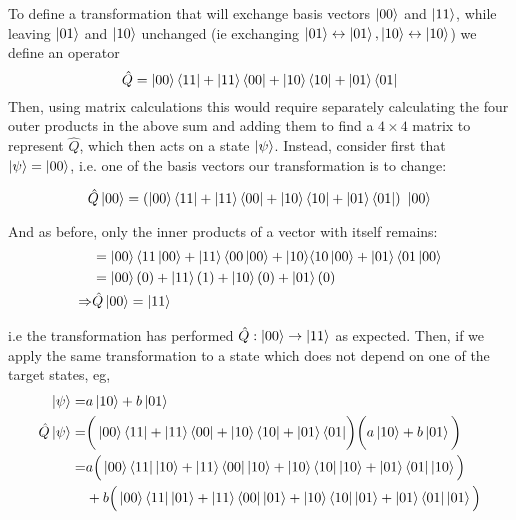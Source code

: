 \begin{example}
    To define a transformation that will exchange basis vectors $\ket{00}$ and $\ket{11}$, 
        while leaving $\ket{01}$ and $\ket{10}$ unchanged (ie exchanging $\ket{01} \leftrightarrow \ket{01}, \ket{10} \leftrightarrow \ket{10} $) 
        we define an operator
    \begin{equation}
        \hat{Q} = \ket{00} \bra{11} + \ket{11} \bra{00} + |10 \rangle \bra{10} + \ket{01} \langle 01| 
    \end{equation}
    Then, using matrix calculations this would require separately calculating the four outer products in the above sum and adding them to find a $4\times4$ matrix to represent $\hat{Q}$, 
        which then acts on a state $\ket{\psi}$. 
    Instead, consider first that $\ket{\psi} = \ket{00}$, i.e. one of the basis vectors our transformation is to change:

    \begin{equation}
        \hat{Q}\ket{00} = \left(\ket{00} \bra{11} + \ket{11} \bra{00} + |10 \rangle \bra{10} + \ket{01} \langle 01|\right) \ \ket{00} 
    \end{equation}

    And as before, only the inner products of a vector with itself remains:
    \begin{equation}
        \begin{split}
            &= \ket{00} \langle 11 \ket{00} + \ket{11} \langle 00 \ket{00} + |10 \rangle \langle 10 \ket{00} + \ket{01} \langle 01\ket{00} 
            \\ &= \ket{00} (0) + \ket{11} (1) + \ket{10} (0) + \ket{01} (0)
            \\ \Rightarrow & \hat{Q}\ket{00} = \ket{11} 
        \end{split}
    \end{equation}

    i.e the transformation has performed $\hat{Q}: \ket{00} \rightarrow \ket{11}$ as expected. 
    Then, if we apply the same transformation to a state which does not depend on one of the target states, eg,  
    \begin{equation}
        \begin{split}
            \ket{\psi} = & a \ket{10} + b \ket{01} 
            \\ \hat{Q}\ket{\psi} = & \bigg( \ket{00} \bra{11} + \ket{11} \bra{00} + |10 \rangle \bra{10} + \ket{01} \langle 01| \bigg) \bigg( a \ket{10} + b \ket{01} \bigg)
            \\ = &a \Big( \ket{00} \bra{11} \ket{10} + \ket{11} \bra{00}\ket{10} + |10 \rangle \bra{10}\ket{10} + \ket{01} \langle 01| \ket{10} \Big) 
            \\   &+ b \Big(\ket{00} \bra{11}\ket{01} + \ket{11} \langle 00|\ket{01} + |10 \rangle \bra{10}\ket{01} + \ket{01} \langle 01|\ket{01}\Big) 
        \end{split}
    \end{equation}


\end{example}
